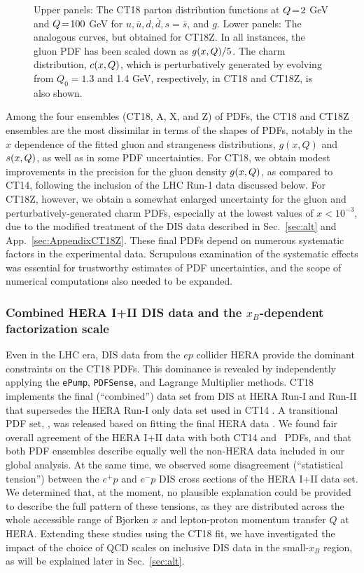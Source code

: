 \begin{figure}[htbp]
	\caption{Upper panels: The CT18 parton distribution functions at $Q\! =\! 2$ GeV and $Q\! =\! 100$ GeV for
		$u, \overline{u}, d, \overline{d}, s = \overline{s}$, and $g$. 
		Lower panels: The analogous curves, but obtained for CT18Z. In all
		instances, the gluon PDF has been scaled down as $g(x,Q)/5$.
		The charm distribution, $c(x,Q)$, which
		is perturbatively generated by evolving from $Q_0\! =\! 1.3$ and 1.4 GeV, respectively, in CT18 and CT18Z, is also shown.
		\label{fig:ct18pdf}}
\end{figure}
%

Among the four ensembles (CT18, A, X, and Z) of PDFs,  the CT18 and CT18Z ensembles are the most dissimilar in terms of the shapes of PDFs, notably in the $x$ dependence of the fitted gluon and strangeness
distributions, $g(x,Q)$ and $s(x,Q)$, as well as in some PDF uncertainties. For CT18, we obtain modest improvements in the precision
for the gluon density $g(x,Q)$, as compared to CT14, following the inclusion of the LHC Run-1 data discussed below. For CT18Z, however, we obtain a somewhat enlarged uncertainty for the gluon and perturbatively-generated charm PDFs, especially at the lowest values
of $x\! <\! 10^{-3}$, due to the modified treatment of the DIS data described in
Sec.~\ref{sec:alt} and App.~\ref{sec:AppendixCT18Z}.
These final PDFs depend on numerous systematic factors in the experimental data. Scrupulous examination of the systematic effects was essential for trustworthy estimates of PDF uncertainties, 
and the scope of numerical computations also needed to be expanded. 

\subsubsection{\label{sec:summary-HERA2} Combined HERA I+II DIS data and the $x_B$-dependent factorization scale }
%
Even in the LHC era, DIS data from the $ep$ collider HERA provide the dominant
constraints on the CT18 PDFs. This dominance is revealed by independently applying the \texttt{ePump}, \texttt{PDFSense},  and Lagrange Multiplier methods.
CT18 implements the final (``combined'') data set from DIS at
HERA Run-I and Run-II \cite{Abramowicz:2015mha} that supersedes the HERA Run-I
only data set \cite{Aaron:2009aa} used in CT14 \cite{Dulat:2015mca}.
A transitional PDF set, \CTHERAII, was released based on fitting the
final HERA data \cite{Hou:2016nqm}. We found fair overall agreement of the HERA I+II
data with both CT14 and \CTHERAII~PDFs, and that both PDF ensembles
describe equally well the non-HERA data included in our global analysis.
At the same time, we observed some disagreement (``statistical tension'') 
between the $e^{+}p$ and $e^{-}p$ DIS cross sections of the HERA I+II data set. 
We determined that, at the moment, no plausible explanation could be provided to describe 
the full pattern of these tensions, as they are distributed across
the whole accessible range of Bjorken $x$ and lepton-proton momentum
transfer $Q$ at HERA.
%
%
Extending these studies using the CT18 fit, we have investigated the impact of the choice of
QCD scales on inclusive DIS data in the small-$x_B$ region, as will be explained later in
Sec.~\ref{sec:alt}.

